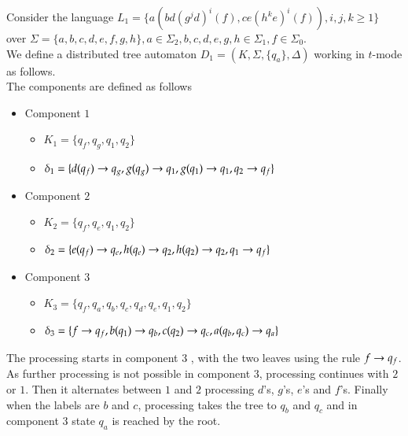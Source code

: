 \begin{example}
\label{eg1}
Consider the language $L_1 = \{a(bd(g^jd)^i(f),ce(h^ke)^i(f)),i, j, k \ge 1\}$ over
$\Sigma = \{a,b,c,d,e,f,g,h\}, a \in \Sigma_2,b,c,d,e,g,h \in \Sigma_1, f \in \Sigma_0$.\\
We define a distributed tree automaton $D_1=(K,\Sigma,\{q_a\},\Delta)$ 
working in $t$-mode as follows.\\
The components are defined as follows
\begin{itemize}%
\item Component $1$
	\begin{itemize}\addtolength{\itemsep}{-0.5\baselineskip}
	\item $K_1 = \{q_f,q_g, q_1,q_2\}$
	\item $\delta_1 = \{ d(q_f) \rightarrow q_g, g(q_g) \rightarrow q_1, g(q_1) \rightarrow q_1, q_2 \rightarrow q_f\}$
	\end{itemize}
\item Component $2$
	\begin{itemize}\addtolength{\itemsep}{-0.5\baselineskip}
	\item $K_2 = \{q_f,q_e, q_1,q_2\}$
	\item $\delta_2 = \{ e(q_f) \rightarrow q_e, h(q_e) \rightarrow q_2, h(q_2) \rightarrow q_2, q_1 \rightarrow q_f\}$
	\end{itemize}
\item Component $3$
	\begin{itemize}\addtolength{\itemsep}{-0.5\baselineskip}
	\item $K_3 = \{q_f,q_a,q_b,q_c,q_d,q_e,q_1,q_2\}$
	\item $\delta_3 = \{ f \rightarrow q_f,b(q_1) \rightarrow q_b, c(q_2) \rightarrow q_c, a(q_b,q_c) \rightarrow q_a\}$
	\end{itemize}
\end{itemize}
\end{example}
The processing starts in component 3 , with the two leaves using 
the rule $f \rightarrow q_f$. As further processing is not possible in component $3$, 
processing continues with $2$ or $1$. Then it alternates between $1$ and $2$ 
processing $d$'s, $g$'s, $e$'s and $f$'s. Finally when the labels are $b$ and $c$, processing 
takes the tree to $q_b$ and $q_c$ and in component $3$ state $q_a$ is reached 
by the root.




